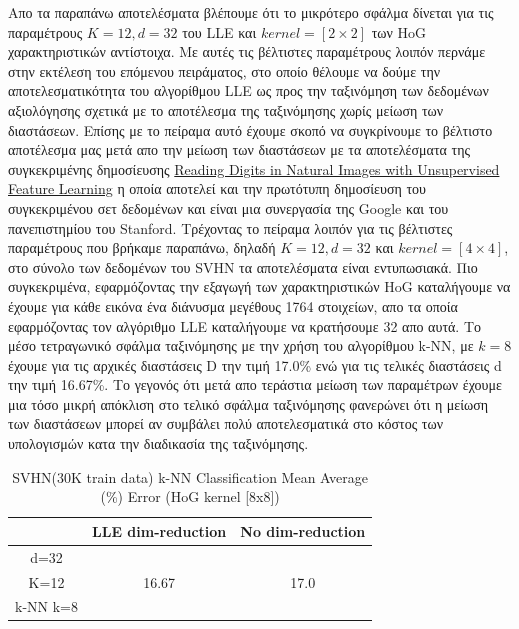\par
Απο τα παραπάνω αποτελέσματα βλέπουμε ότι το μικρότερο σφάλμα δίνεται για τις παραμέτρους $K=12, d=32$ του \textlatin{LLE} και $kernel=[2 \times 2]$ των \textlatin{HoG} χαρακτηριστικών αντίστοιχα. Με αυτές τις βέλτιστες παραμέτρους λοιπόν περνάμε στην εκτέλεση του επόμενου πειράματος, στο οποίο θέλουμε να δούμε την αποτελεσματικότητα του αλγορίθμου \textlatin{LLE} ως προς την ταξινόμηση των δεδομένων αξιολόγησης σχετικά με το αποτέλεσμα της ταξινόμησης χωρίς μείωση των διαστάσεων. Επίσης με το πείραμα αυτό έχουμε σκοπό να συγκρίνουμε το βέλτιστο αποτέλεσμα μας μετά απο την μείωση των διαστάσεων με τα αποτελέσματα της συγκεκριμένης δημοσίευσης \href{http://ufldl.stanford.edu/housenumbers/nips2011\textunderscore housenumbers.pdf}{\textlatin{Reading Digits in Natural Images
with Unsupervised Feature Learning}} η οποία αποτελεί και την πρωτότυπη δημοσίευση του συγκεκριμένου σετ δεδομένων και είναι μια συνεργασία της \textlatin{Google} και του πανεπιστημίου του \textlatin{Stanford}. Τρέχοντας το πείραμα λοιπόν για τις βέλτιστες παραμέτρους που βρήκαμε παραπάνω, δηλαδή $K=12, d=32$ και $kernel=[4 \times 4]$, στο σύνολο των δεδομένων του \textlatin{SVHN} τα αποτελέσματα είναι εντυπωσιακά. Πιο συγκεκριμένα, εφαρμόζοντας την εξαγωγή των χαρακτηριστικών \textlatin{HoG} καταλήγουμε να έχουμε για κάθε εικόνα ένα διάνυσμα μεγέθους 1764 στοιχείων, απο τα οποία εφαρμόζοντας τον αλγόριθμο \textlatin{LLE} καταλήγουμε να κρατήσουμε 32 απο αυτά. Το μέσο τετραγωνικό σφάλμα ταξινόμησης με την χρήση του αλγορίθμου \textlatin{k-NN}, με $k=8$ έχουμε για τις αρχικές διαστάσεις \textlatin{D} την τιμή 17.0\% ενώ για τις τελικές διαστάσεις \textlatin{d} την τιμή 16.67\%. Το γεγονός ότι μετά απο τεράστια μείωση των παραμέτρων έχουμε μια τόσο μικρή απόκλιση στο τελικό σφάλμα ταξινόμησης φανερώνει ότι η μείωση των διαστάσεων μπορεί αν συμβάλει πολύ αποτελεσματικά στο κόστος των υπολογισμών κατα την διαδικασία της ταξινόμησης.
\begin{table}[H]
\centering
\label{tab:table14}
\begin{tabular}{|c|c|c|}
\hline
 & LLE dim-reduction & No dim-reduction \\
\hline
d=32 & & \\
K=12 & 16.67 & 17.0 \\
k-NN k=8 & & \\
\hline
\end{tabular}
\caption{SVHN(30K train data) k-NN Classification Mean Average (\%) Error (HoG kernel [8x8])}
\end{table}

